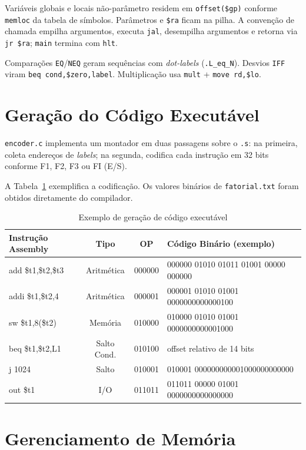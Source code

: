 \documentclass[
	12pt,				%
	openright,			%
	a4paper,			%
	english,			%
	french,				%
	spanish,			%
	brazil,				%
	]{abntex2}
\begin{document}
Variáveis globais e locais não-parâmetro residem em \texttt{offset(\$gp)} conforme \texttt{memloc} da tabela de símbolos. Parâmetros e \texttt{\$ra} ficam na pilha. A convenção de chamada empilha argumentos, executa \texttt{jal}, desempilha argumentos e retorna via \texttt{jr \$ra}; \texttt{main} termina com \texttt{hlt}.

Comparações \texttt{EQ}/\texttt{NEQ} geram sequências com \emph{dot-labels} (\texttt{.L\_eq\_N}). Desvios \texttt{IFF} viram \texttt{beq cond,\$zero,label}. Multiplicação usa \texttt{mult} + \texttt{move rd,\$lo}.

\section{Geração do Código Executável}

\texttt{encoder.c} implementa um montador em duas passagens sobre o \texttt{.s}: na primeira, coleta endereços de \emph{labels}; na segunda, codifica cada instrução em 32 bits conforme F1, F2, F3 ou FI (E/S).

A Tabela~\ref{tab:codigo-executavel} exemplifica a codificação. Os valores binários de \texttt{fatorial.txt} foram obtidos diretamente do compilador.

\begin{table}[H]
\centering
\caption{Exemplo de geração de código executável}
\label{tab:codigo-executavel}
\small
\begin{tabular}{|p{3.2cm}|c|c|p{4.8cm}|}
\hline
\textbf{Instrução Assembly} & \textbf{Tipo} & \textbf{OP} & \textbf{Código Binário (exemplo)} \\
\hline
add \$t1,\$t2,\$t3 & Aritmética & 000000 & 000000 01010 01011 01001 00000 000000 \\
\hline
addi \$t1,\$t2,4 & Aritmética & 000001 & 000001 01010 01001 0000000000000100 \\
\hline
sw \$t1,8(\$t2) & Memória & 010000 & 010000 01010 01001 0000000000001000 \\
\hline
beq \$t1,\$t2,L1 & Salto Cond. & 010100 & offset relativo de 14 bits \\
\hline
j 1024 & Salto & 010001 & 010001 000000000001000000000000 \\
\hline
out \$t1 & I/O & 011011 & 011011 00000 01001 0000000000000000 \\
\hline
\end{tabular}
\end{table}



\section{Gerenciamento de Memória}
\end{document}
